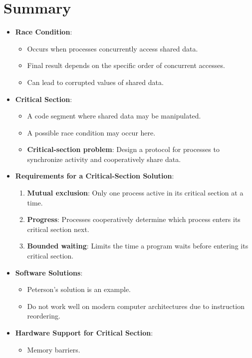 \section{Summary}
\begin{itemize}
    \item \textbf{Race Condition}:
    \begin{itemize}
        \item Occurs when processes concurrently access shared data.
        \item Final result depends on the specific order of concurrent accesses.
        \item Can lead to corrupted values of shared data.
    \end{itemize}
    \item \textbf{Critical Section}:
    \begin{itemize}
        \item A code segment where shared data may be manipulated.
        \item A possible race condition may occur here.
        \item \textbf{Critical-section problem}: Design a protocol for processes to synchronize activity and cooperatively share data.
    \end{itemize}
    \item \textbf{Requirements for a Critical-Section Solution}:
    \begin{enumerate}
        \item \textbf{Mutual exclusion}: Only one process active in its critical section at a time.
        \item \textbf{Progress}: Processes cooperatively determine which process enters its critical section next.
        \item \textbf{Bounded waiting}: Limits the time a program waits before entering its critical section.
    \end{enumerate}
    \item \textbf{Software Solutions}:
    \begin{itemize}
        \item Peterson's solution is an example.
        \item Do not work well on modern computer architectures due to instruction reordering.
    \end{itemize}
    \item \textbf{Hardware Support for Critical Section}:
    \begin{itemize}
        \item Memory barriers.

\end{itemize}
\end{itemize}
